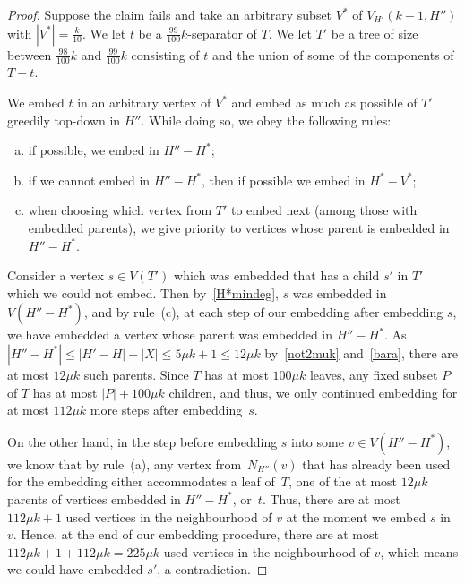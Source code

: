 \documentclass[12pt]{article}
\begin{document}
\begin{proof}
Suppose the claim fails and 
     take an arbitrary subset $V^*$ of $V_{H'}(k-1, H'')$ with $|V^*|=\frac k{10}$. 
We let $t$ be a $\frac{99}{100}k$-separator of $T$. We let $T'$ be a tree 
of size between $\frac{98}{100}k$ and $\frac{99}{100}k$ consisting of $t$ and the union of some of the 
components of $T-t$.  


We embed $t$ in an arbitrary vertex of $V^*$ and embed as much as possible of $T'$  greedily top-down in $H''$. While doing so, we obey the following rules:
\begin{enumerate}[(a)]
\item if possible, we embed in $H''-H^*$;
\item if we cannot embed in $H''-H^*$, then if possible we embed in $H^*-V^*$;
\item when choosing which  vertex from $T'$ to embed next (among those with embedded parents), we give priority to vertices whose parent is embedded in $H''-H^*$.
\end{enumerate}


Consider  a vertex $s\in V(T')$ which  was embedded that has a child $s'$ in $T'$ which we could not embed. Then by~\eqref{H*mindeg}, $s$ was embedded in $V(H''-H^*)$, and by rule~(c),
 at each step of our embedding after embedding $s$, we have embedded a vertex whose parent was embedded in $H''-H^*$.  
 As 
 $|H''-H^*|\le |H'-H|+|X| \le 5\mu k+1 \le 12\mu k$ by~\eqref{not2muk} and~\eqref{bara}, there are at most $12\mu k$ such parents.  Since $T$ has at most  $100\mu k$ leaves, any fixed subset $P$ of $T$ has at most $|P|+100\mu k$ children, and thus, we only continued embedding for at most $112\mu k$ more steps after embedding~$s$.

On the other hand, in the step before embedding $s$ into some $v\in V(H''-H^*)$, we know that by rule~(a), any vertex from~$N_{H''}(v)$ that has already  been used for the embedding either accommodates a leaf of~$T$, one of the at most $12\mu k$ parents of  vertices embedded in $H''-H^*$,   or~$t$. Thus, there are at most $112\mu k+1$ used vertices in the neighbourhood of $v$ at the moment we embed $s$ in $v$. Hence, at the end of our embedding procedure, there are at most $112\mu k+1+112\mu k=225\mu k$ used vertices in the neighbourhood of $v$, which means we could  have embedded $s'$, a contradiction.


\end{proof}
\end{document}

